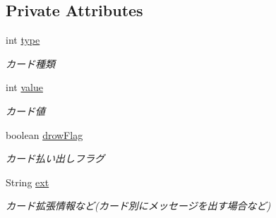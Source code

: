 \subsection*{Private Attributes}
\begin{DoxyCompactItemize}
\item 
\mbox{\label{classjp_1_1gr_1_1java__conf_1_1yuta__yoshinaga_1_1java__trumpcards_1_1_card_af77cbc403a7cb0fb5be8610c187e4ff0}} 
int \hyperlink{classjp_1_1gr_1_1java__conf_1_1yuta__yoshinaga_1_1java__trumpcards_1_1_card_af77cbc403a7cb0fb5be8610c187e4ff0}{type}
\begin{DoxyCompactList}\small\item\em カード種類 \end{DoxyCompactList}\item 
\mbox{\label{classjp_1_1gr_1_1java__conf_1_1yuta__yoshinaga_1_1java__trumpcards_1_1_card_ac71a33a6ef74fca7746b80f02dcd9485}} 
int \hyperlink{classjp_1_1gr_1_1java__conf_1_1yuta__yoshinaga_1_1java__trumpcards_1_1_card_ac71a33a6ef74fca7746b80f02dcd9485}{value}
\begin{DoxyCompactList}\small\item\em カード値 \end{DoxyCompactList}\item 
\mbox{\label{classjp_1_1gr_1_1java__conf_1_1yuta__yoshinaga_1_1java__trumpcards_1_1_card_a5ea32985f61009d9e2a99733299bc659}} 
boolean \hyperlink{classjp_1_1gr_1_1java__conf_1_1yuta__yoshinaga_1_1java__trumpcards_1_1_card_a5ea32985f61009d9e2a99733299bc659}{drow\+Flag}
\begin{DoxyCompactList}\small\item\em カード払い出しフラグ \end{DoxyCompactList}\item 
\mbox{\label{classjp_1_1gr_1_1java__conf_1_1yuta__yoshinaga_1_1java__trumpcards_1_1_card_abb47646d84d1b03f3734defbefd32664}} 
String \hyperlink{classjp_1_1gr_1_1java__conf_1_1yuta__yoshinaga_1_1java__trumpcards_1_1_card_abb47646d84d1b03f3734defbefd32664}{ext}
\begin{DoxyCompactList}\small\item\em カード拡張情報など(カード別にメッセージを出す場合など) \end{DoxyCompactList}\end{DoxyCompactItemize}



